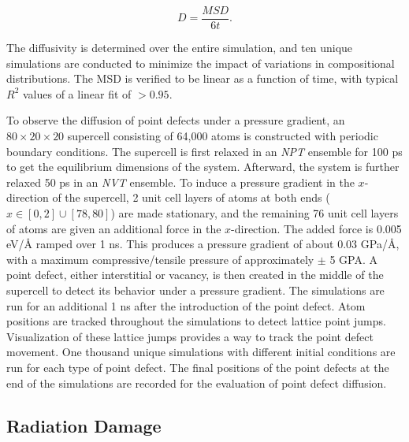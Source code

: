 \documentclass[review]{elsarticle}
\begin{document}
\begin{equation}
    D = \frac{MSD}{6t}.
\end{equation}

\noindent The diffusivity is determined over the entire simulation, and ten unique simulations are conducted to minimize the impact of variations in compositional distributions. The MSD is verified to be linear as a function of time, with typical $R^2$ values of a linear fit of $> 0.95$.

To observe the diffusion of point defects under a pressure gradient, an $80 \times 20 \times 20$ supercell consisting of 64,000 atoms is constructed with periodic boundary conditions. The supercell is first relaxed in an \textit{NPT} ensemble for 100 ps to get the equilibrium dimensions of the system. Afterward, the system is further relaxed 50 ps in an \textit{NVT} ensemble. To induce a pressure gradient in the $x$-direction of the supercell, 2 unit cell layers of atoms at both ends ($x \in [0, 2] \cup [78, 80]$) are made stationary, and the remaining 76 unit cell layers of atoms are given an additional force in the $x$-direction. The added force is 0.005 eV/\r{A} ramped over 1 ns. This produces a pressure gradient of about 0.03 GPa/\r{A}, with a maximum compressive/tensile pressure of approximately $\pm$ 5 GPA. A point defect, either interstitial or vacancy, is then created in the middle of the supercell to detect its behavior under a pressure gradient. The simulations are run for an additional 1 ns after the introduction of the point defect. Atom positions are tracked throughout the simulations to detect lattice point jumps. Visualization of these lattice jumps provides a way to track the point defect movement. One thousand unique simulations with different initial conditions are run for each type of point defect. The final positions of the point defects at the end of the simulations are recorded for the evaluation of point defect diffusion.

\subsection{Radiation Damage}
\end{document}
